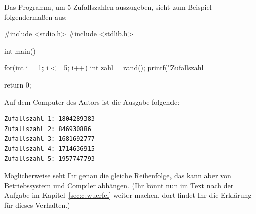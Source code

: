         Das Programm, um 5 Zufallszahlen auszugeben, sieht zum Beispiel folgendermaßen aus:
\begin{code}[numbers=none]
#include <stdio.h>
#include <stdlib.h>

int main() {
    for(int i = 1; i <= 5; i++) {
        int zahl = rand();
        printf("Zufallszahl %
    }

    return 0;
}
\end{code}
Auf dem Computer des Autors ist die Ausgabe folgende:
\begin{verbatim}
Zufallszahl 1: 1804289383
Zufallszahl 2: 846930886
Zufallszahl 3: 1681692777
Zufallszahl 4: 1714636915
Zufallszahl 5: 1957747793
\end{verbatim}
    Möglicherweise seht Ihr genau die gleiche Reihenfolge, das kann aber von Betriebssystem und Compiler abhängen.
    (Ihr könnt nun im Text nach der Aufgabe im Kapitel~\ref{sec:c:wuerfel} weiter machen, dort findet Ihr die Erklärung für dieses Verhalten.)
